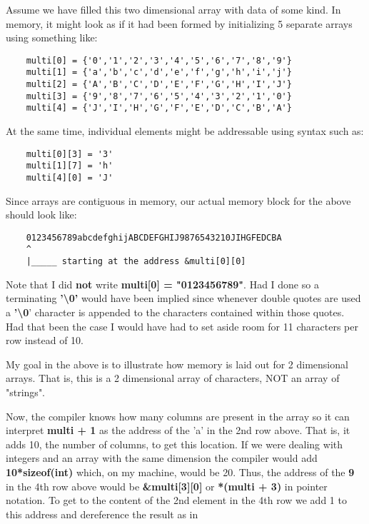Assume we have filled this two dimensional array with data of some kind.
In memory, it might look as if it had been formed by initializing 5
separate arrays using something like:

\begin{verbatim}
    multi[0] = {'0','1','2','3','4','5','6','7','8','9'}
    multi[1] = {'a','b','c','d','e','f','g','h','i','j'}
    multi[2] = {'A','B','C','D','E','F','G','H','I','J'}
    multi[3] = {'9','8','7','6','5','4','3','2','1','0'}
    multi[4] = {'J','I','H','G','F','E','D','C','B','A'}

\end{verbatim}

At the same time, individual elements might be addressable using syntax
such as:

\begin{verbatim}
    multi[0][3] = '3'
    multi[1][7] = 'h'
    multi[4][0] = 'J'
\end{verbatim}

Since arrays are contiguous in memory, our actual memory block for the
above should look like:

\begin{verbatim}
    0123456789abcdefghijABCDEFGHIJ9876543210JIHGFEDCBA
    ^
    |_____ starting at the address &multi[0][0]
\end{verbatim}

Note that I did \textbf{not} write \textbf{multi{[}0{]} = "0123456789"}.
Had I done so a terminating \textbf{'\textbackslash0'} would have been
implied since whenever double quotes are used a
\textbf{'\textbackslash0}' character is appended to the characters
contained within those quotes. Had that been the case I would have had
to set aside room for 11 characters per row instead of 10.

My goal in the above is to illustrate how memory is laid out for 2
dimensional arrays. That is, this is a 2 dimensional array of
characters, NOT an array of "strings".

Now, the compiler knows how many columns are present in the array so it
can interpret \textbf{multi + 1} as the address of the 'a' in the 2nd
row above. That is, it adds 10, the number of columns, to get this
location. If we were dealing with integers and an array with the same
dimension the compiler would add \textbf{10*sizeof(int)} which, on my
machine, would be 20. Thus, the address of the \textbf{9} in the 4th row
above would be \textbf{\&multi{[}3{]}{[}0{]}} or \textbf{*(multi + 3)}
in pointer notation. To get to the content of the 2nd element in the 4th
row we add 1 to this address and dereference the result as in

